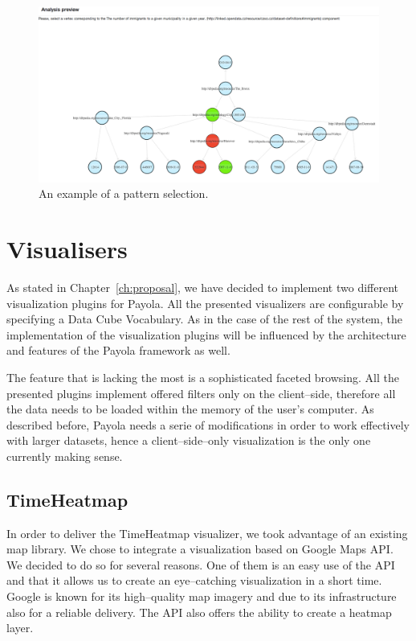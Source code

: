 \begin{figure}
	\centering
	\includegraphics[width=140mm]{img/pattern-selection.png}
	\caption{An example of a pattern selection.}
	\label{fig:pattern-selection}
\end{figure}

\section{Visualisers}
As stated in Chapter~\ref{ch:proposal}, we have decided to implement two 
different visualization plugins for Payola. All the presented 
visualizers are configurable by specifying a Data Cube Vocabulary.
As in the case of the rest of the 
system, the implementation of the visualization plugins will be influenced 
by the architecture and features of the Payola framework as well.

The feature that is lacking the most  is a sophisticated faceted browsing. All the presented plugins 
implement offered filters only on the client--side, therefore all the data needs 
to be loaded within the memory of the user’s computer. As described before, Payola 
needs a serie of modifications in order to work effectively with larger 
datasets, hence a client--side--only visualization is the only one currently making sense.

\subsection{TimeHeatmap}
In order to deliver the TimeHeatmap visualizer, we took advantage of an existing 
map library. We chose to integrate a visualization based on Google Maps API. We 
decided to do so for several reasons. One of them is an easy use of the API and that it allows us to
create an eye--catching visualization in a short 
time. Google is known for its high--quality map imagery and due to its 
infrastructure also for a reliable delivery. The API also offers the ability to create a heatmap layer.

